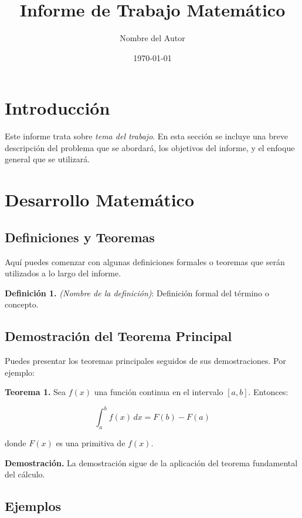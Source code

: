 \documentclass[a4paper,12pt]{article}
\title{Informe de Trabajo Matemático}
\author{Nombre del Autor}
\date{\today}
\begin{document}
\maketitle

\tableofcontents %

\newpage

\section{Introducción}

Este informe trata sobre \textit{tema del trabajo}. En esta sección se incluye una breve descripción del problema que se abordará, los objetivos del informe, y el enfoque general que se utilizará.

\section{Desarrollo Matemático}

\subsection{Definiciones y Teoremas}

Aquí puedes comenzar con algunas definiciones formales o teoremas que serán utilizados a lo largo del informe.

\textbf{Definición 1.} \textit{(Nombre de la definición)}: Definición formal del término o concepto.

\subsection{Demostración del Teorema Principal}

Puedes presentar los teoremas principales seguidos de sus demostraciones. Por ejemplo:

\textbf{Teorema 1.} Sea \( f(x) \) una función continua en el intervalo \([a,b]\). Entonces:

\[
\int_a^b f(x) \, dx = F(b) - F(a)
\]

donde \( F(x) \) es una primitiva de \( f(x) \).

\textbf{Demostración.} La demostración sigue de la aplicación del teorema fundamental del cálculo.

\subsection{Ejemplos}
\end{document}
